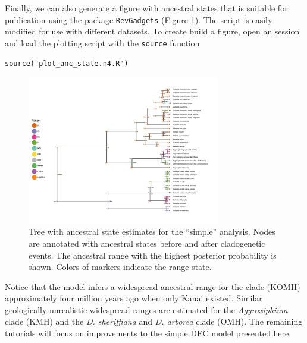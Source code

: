 Finally, we can also generate a figure with ancestral states that is suitable for publication using the \R package {\tt RevGadgets} (Figure \ref{fig:simple_RevGadgets_ase}).
The script is easily modified for use with different datasets.
To create build a figure, open an \R session and load the plotting script with the {\tt source} function
\begin{snugshade}
\begin{lstlisting}
source("plot_anc_state.n4.R")
\end{lstlisting}
\end{snugshade}

\begin{figure}[!h]
\centering
\includegraphics[width=0.75\textwidth]{figures/fig_simple_RevGadgets_ase.pdf}
\caption{Tree with ancestral state estimates for the ``simple'' analysis. Nodes are annotated with ancestral states before and after cladogenetic events. The ancestral range with the highest posterior probability is shown. Colors of markers indicate the range state.}
\label{fig:simple_RevGadgets_ase}
\end{figure}

Notice that the model infers a widespread ancestral range for the clade (KOMH) approximately four million years ago when only Kauai existed.
Similar geologically unrealistic widespread ranges are estimated for the {\it Agyroxiphium} clade (KMH) and the {\it D. sheriffiana} and {\it D. arborea} clade (OMH).
The remaining tutorials will focus on improvements to the simple DEC model presented here.

\newpage
